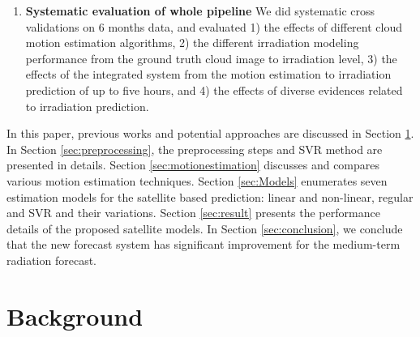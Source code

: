 \documentclass[conference]{IEEEtran}
\begin{document}
\begin{enumerate}
\item \textbf{Systematic evaluation of whole pipeline} 
We did systematic cross validations on 6 months data, and evaluated 1) the
effects of different cloud motion estimation algorithms, 2) the different irradiation modeling performance from the ground truth cloud 
image to irradiation level, 3) the effects of the integrated system from the motion 
estimation to irradiation prediction of up to five hours,  and 
4) the effects of diverse evidences related to irradiation prediction. 



\end{enumerate}

In this paper, previous works and potential approaches are discussed in
Section \ref{sec:bg}. In Section \ref{sec:preprocessing}, the preprocessing steps and
SVR method are presented in details.  Section \ref{sec:motionestimation} discusses and compares various motion estimation techniques.  Section \ref{sec:Models} enumerates seven estimation models for the satellite based prediction:  linear and non-linear, regular and SVR and their variations.  Section \ref{sec:result} presents the performance details of the proposed satellite models.
In Section \ref{sec:conclusion}, we conclude
that the new forecast system has significant improvement for the 
medium-term radiation forecast.


\section{Background}
\label{sec:bg}
\end{document}
